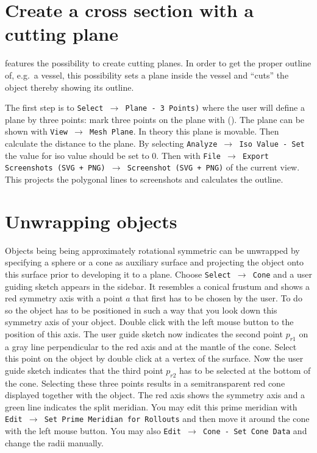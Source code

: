 \section{Create a cross section with a cutting plane}
\GigaMesh features the possibility to create cutting planes. In order to get the proper outline of, e.g.~a vessel, this possibility sets a plane inside the vessel and ``cuts'' the object thereby showing its outline.

The first step is to \texttt{Select $\rightarrow$ Plane - 3 Points)} where the user will define a plane by three points: mark three points on the plane with (). The plane can be shown with \texttt{View $\rightarrow$ Mesh Plane}. In theory this plane is movable. Then calculate the distance to the plane. By selecting \texttt{Analyze $\rightarrow$ Iso Value - Set} the value for iso value should be set to 0. Then with \texttt{File $\rightarrow$ Export Screenshots (SVG + PNG) $\rightarrow$ Screenshot (SVG + PNG)} of the current view. This projects the polygonal lines to screenshots and calculates the outline.


\section{Unwrapping objects}\label{unwrap}
Objects being being approximately rotational symmetric can be unwrapped by specifying a sphere or a cone as auxiliary surface and projecting the object onto this surface prior to developing it to a plane. Choose {\tt Select  $\rightarrow$ Cone} and a user guiding sketch appears in the sidebar. It resembles a conical frustum and shows a red symmetry axis with a point $a$ that first has to be chosen by the user. To do so the object has to be positioned in such a way that you look down this symmetry axis of your object. Double click with the left mouse button to the position of this axis. The user guide sketch now indicates the second point $p_{r1}$ on a gray line perpendicular to the red axis and at the mantle of the cone. Select this point on the object by double click at a vertex of the surface. Now the user guide sketch indicates that the third point $p_{r2} $ has to be selected at the bottom of the cone. Selecting these three points results in a semitransparent red cone displayed together with the object. The red axis shows the symmetry axis and a green line indicates the split meridian. You may edit this prime meridian with {\tt Edit $\rightarrow$ Set Prime Meridian for Rollouts} and then move it around the cone with the left mouse button. You may also {\tt Edit $\rightarrow$ Cone - Set Cone Data} and change the radii manually. 

